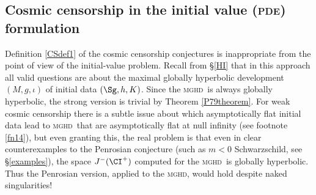 \documentclass[11pt,a4paper]{article}
\newcommand{\mghd}{\textsc{mghd}}
\newcommand{\pde}{\textsc{pde}}
\begin{document}
\subsection{Cosmic censorship in the initial value (\pde) formulation}\label{PDECCC}
Definition \ref{CSdef1} of the cosmic censorship conjectures is inappropriate from the point of view of the initial-value problem. 
Recall from \S\ref{HI}  that in this approach all valid questions are  about the maximal globally hyperbolic development $(M,g,\iota)$ of  initial data $(\Sg,h,K)$. Since the \mghd\ is always globally hyperbolic, the strong version is trivial by Theorem \ref{P79theorem}. For weak cosmic censorship there is a subtle issue about which asymptotically flat  initial data lead to 
\mghd\ that are  asymptotically flat at null infinity (see footnote \ref{fn14}), but even granting this, the real problem is that 
 even in clear counterexamples to the Penrosian conjecture (such as $m<0$ Schwarzschild, see \S\ref{examples}), the 
 space $J^-(\CI^+)$ computed for the \mghd\ is  globally hyperbolic. Thus the Penrosian version, applied to the \mghd, would 
 hold despite naked singularities!
\end{document}
